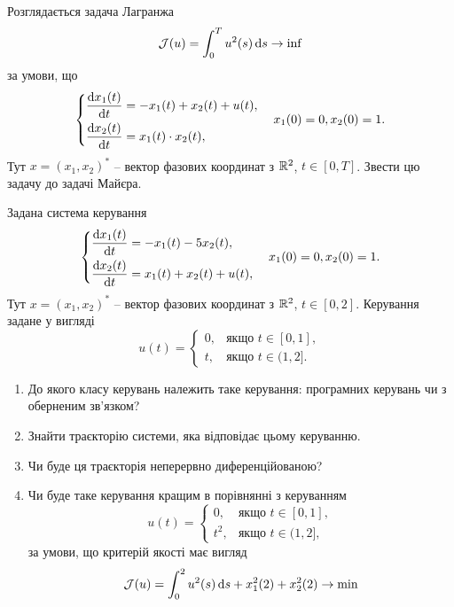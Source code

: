\begin{problem}
	Розглядається задача Лагранжа
		\[
		\mathcal{J}(u)
		=
		\int_0^T u^2(s) \mathop{}\!\mathrm{d} s \to \inf
		\]
		за умови, що
		\[
			\left\{
				\begin{aligned}
					\dfrac{\mathop{}\!\mathrm{d} x_1(t)}{\mathop{}\!\mathrm{d} t} &= -x_1(t) + x_2(t) + u(t), \\
					\dfrac{\mathop{}\!\mathrm{d} x_2(t)}{\mathop{}\!\mathrm{d} t} &= x_1(t) \cdot x_2(t),
				\end{aligned}
			\right.
			\quad
			x_1(0)=0, x_2(0)=1.
		\]
		Тут $x=(x_1,x_2)^*$ -- вектор фазових координат з $\mathbb{R}^2$, $t\in[0,T]$. Звести цю задачу до задачі Майєра.
\end{problem}



\begin{problem}
	Задана система керування \[ \left\{ \begin{aligned}
		\frac{\mathop{}\!\mathrm{d} x_1 (t)}{\mathop{}\!\mathrm{d} t} &= - x_1 (t) - 5 x_2 (t), \\
		\frac{\mathop{}\!\mathrm{d} x_2 (t)}{\mathop{}\!\mathrm{d} t} &= x_1 (t) + x_2 (t) + u(t),
	\end{aligned} \right. 
	\quad x_1 (0) = 0, x_2 (0) = 1. \]
	Тут $x = (x_1, x_2)^*$ -- вектор фазових координат з $\mathbb{R}^2$, $t \in [0, 2]$. Керування задане у вигляді \[ u(t) = \begin{cases} 0, & \text{якщо } t \in [0, 1], \\ t, & \text{якщо } t \in (1, 2]. \end{cases} \]
	\begin{enumerate}
		\item До якого класу керувань належить таке керування: програмних керувань чи з оберненим зв'язком?

		\item Знайти траєкторію системи, яка відповідає цьому керуванню.

		\item Чи буде ця траєкторія неперервно диференційованою?

		\item Чи буде таке керування кращим в порівнянні з керуванням \[ u(t) = \begin{cases} 0, & \text{якщо } t \in [0, 1], \\ t^2, & \text{якщо } t \in (1, 2], \end{cases} \] за умови, що критерій якості має вигляд \[ \mathcal{J} (u) = \int_0^2 u^2(s) \mathop{}\!\mathrm{d} s + x_1^2 (2) + x_2^2 (2) \to \min \]
	\end{enumerate}
\end{problem}

